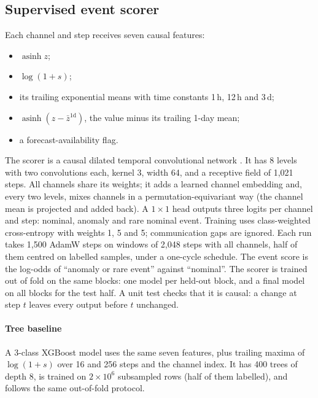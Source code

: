 \documentclass[preprint,12pt,authoryear]{elsarticle}
\begin{document}
\subsection{Supervised event scorer}\label{sec:model}
Each channel and step receives seven causal features:
\begin{itemize}
\item $\operatorname{asinh} z$;
\item $\log(1+s)$;
\item its trailing exponential means with time constants 1\,h, 12\,h and 3\,d;
\item $\operatorname{asinh}(z-\bar z^{1\mathrm{d}})$, the value minus its trailing 1-day
  mean;
\item a forecast-availability flag.
\end{itemize}
The scorer is a causal dilated temporal convolutional network \citep{bai2018tcn}. It has 8
levels with two convolutions each, kernel 3, width 64, and a receptive field of 1{,}021
steps. All channels share its weights; it adds a learned channel embedding and, every two
levels, mixes channels in a permutation-equivariant way (the channel mean is projected and
added back). A $1\times1$ head outputs three logits per channel and step: nominal, anomaly
and rare nominal event. Training uses class-weighted cross-entropy with weights 1, 5 and 5;
communication gaps are ignored. Each run takes 1{,}500 AdamW steps on windows of 2{,}048
steps with all channels, half of them centred on labelled samples, under a one-cycle
schedule. The event score is the log-odds of ``anomaly or rare event'' against ``nominal''.
The scorer is trained out of fold on the same blocks: one model per held-out block, and a
final model on all blocks for the test half. A unit test checks that it is causal: a change
at step $t$ leaves every output before $t$ unchanged.

\paragraph{Tree baseline}
A 3-class XGBoost model \citep{chen2016xgboost} uses the same seven features, plus trailing
maxima of $\log(1+s)$ over 16 and 256 steps and the channel index. It has 400 trees of depth
8, is trained on $2\times10^{6}$ subsampled rows (half of them labelled), and follows the
same out-of-fold protocol.
\end{document}
